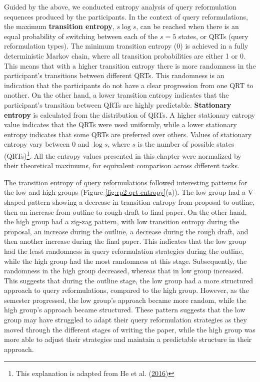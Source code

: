 \documentclass[letterpaper, nobind]{templates/ociamthesis}
\begin{document}
Guided by the above, we conducted entropy analysis of query reformulation sequences produced by the participants.
In the context of query reformulations, the maximum \textbf{transition entropy}, \(s \log s\), can be reached when there is an equal probability of switching between each of the \(s = 5\) states, or QRTs (query reformulation types).
The minimum transition entropy (0) is achieved in a fully deterministic Markov chain, where all transition probabilities are either 1 or 0.
This means that with a higher transition entropy there is more randomness in the participant's transitions between different QRTs.
This randomness is an indication that the participants do not have a clear progression from one QRT to another.
On the other hand, a lower transition entropy indicates that the participant's transition between QRTs are highly predictable.
\textbf{Stationary entropy} is calculated from the distribution of QRTs.
A higher stationary entropy value indicates that the QRTs were used uniformly, while a lower stationary entropy indicates that some QRTs are preferred over others.
Values of stationary entropy vary between 0 and \(\log s\), where \(s\) is the number of possible states (QRTs)\footnote{This explanation is adapted from He et al. (\protect\hyperlink{ref-he2016beyond}{2016})}.
All the entropy values presented in this chapter were normalized by their theoretical maximums, for equivalent comparison across different tasks.

The transition entropy of query reformulations followed interesting patterns for the low and high groups (Figure \ref{fig:rp2-qrt-entropy}(a)).
The low group had a V-shaped pattern showing a decrease in transition entropy from proposal to outline, then an increase from outline to rough draft to final paper.
On the other hand, the high group had a zig-zag pattern, with low transition entropy during the proposal, an increase during the outline, a decrease during the rough draft, and then another increase during the final paper.
This indicates that the low group had the least randomness in query reformulation strategies during the outline, while the high group had the most randomness at this stage.
Subsequently, the randomness in the high group decreased, whereas that in low group increased.
This suggests that during the outline stage, the low group had a more structured approach to query reformulations, compared to the high group.
However, as the semester progressed, the low group's approach became more random, while the high group's approach became structured.
These pattern suggests that the low group may have struggled to adapt their query reformulation strategies as they moved through the different stages of writing the paper, while the high group was more able to adjust their strategies and maintain a predictable structure in their approach.
\end{document}
